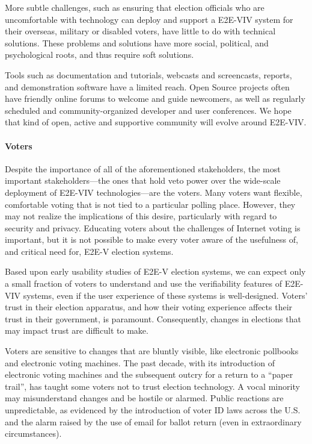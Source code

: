 More subtle challenges, such as ensuring that election officials who
are uncomfortable with technology can deploy and support a E2E-VIV
system for their overseas, military or disabled voters, have little to
do with technical solutions. These problems and solutions have more
social, political, and psychological roots, and thus require soft
solutions.

Tools such as documentation and tutorials, webcasts and screencasts,
reports, and demonstration software have a limited reach. Open Source
projects often have friendly online forums to welcome and guide
newcomers, as well as regularly scheduled and community-organized
developer and user conferences. We hope that kind of open, active and
supportive community will evolve around E2E-VIV.

\paragraph{Voters} 
Despite the importance of all of the aforementioned stakeholders, the
most important stakeholders---the ones that hold veto power over the
wide-scale deployment of E2E-VIV technologies---are the voters. Many
voters want flexible, comfortable voting that is not tied to a
particular polling place. However, they may not realize the
implications of this desire, particularly with regard to security and
privacy. Educating voters about the challenges of Internet voting is
important, but it is not possible to make every voter aware of the
usefulness of, and critical need for, E2E-V election systems.

Based upon early usability studies of E2E-V election systems, we can
expect only a small fraction of voters to understand and use the
verifiability features of E2E-VIV systems, even if the user experience
of these systems is well-designed. Voters’ trust in their election
apparatus, and how their voting experience affects their trust in
their government, is paramount. Consequently, changes in elections
that may impact trust are difficult to make.

Voters are sensitive to changes that are bluntly visible, like
electronic pollbooks and electronic voting machines. The past decade,
with its introduction of electronic voting machines and the subsequent
outcry for a return to a “paper trail”, has taught some voters not to
trust election technology. A vocal minority may misunderstand changes
and be hostile or alarmed. Public reactions are unpredictable, as
evidenced by the introduction of voter ID laws across the U.S. and the
alarm raised by the use of email for ballot return (even in
extraordinary circumstances).

